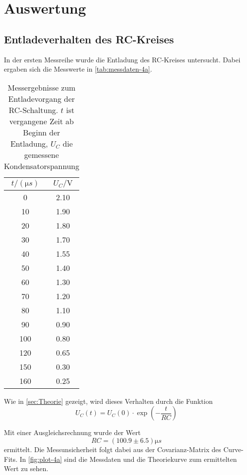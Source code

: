 \section{Auswertung}
\label{sec:Auswertung}

\subsection{Entladeverhalten des RC-Kreises}
\label{sec:4a-auswertung}

In der ersten Messreihe wurde die Entladung des RC-Kreises untersucht. Dabei ergaben sich
die Messwerte in \autoref{tab:messdaten-4a}.

\begin{table}
	\centering
	\caption{Messergebnisse zum Entladevorgang der RC-Schaltung. $t$ ist vergangene Zeit 
	ab Beginn der Entladung, $U_C$ die gemessene Kondensatorspannung}
	\label{tab:messdaten-4a}
	\begin{tabular}{c c}
		\toprule
		$t / (\si{\micro s})$ & $U_C / \si{\volt}$ \\
		\midrule
		0  	&2.10 \\
		10  	&1.90 \\
		20  	&1.80 \\
		30  	&1.70 \\
		40  	&1.55 \\
		50  	&1.40 \\
		60  	&1.30 \\
		70  	&1.20 \\
		80  	&1.10 \\
		90  	&0.90 \\
		100  	&0.80 \\
		120  	&0.65 \\
		150  	&0.30 \\
		160  	&0.25 \\
		\bottomrule
	\end{tabular}
\end{table}

Wie in \autoref{sec:Theorie} gezeigt, wird dieses Verhalten durch die Funktion
\begin{equation}
	U_C(t) = U_C(0) \cdot \exp\left(-\frac{t}{RC}\right)
\end{equation}

Mit einer Ausgleichsrechnung wurde der Wert
\begin{equation}
	RC = (100.9 \pm 6.5) \si{\micro s}
	\label{eqn:ergebnis-4a}
\end{equation}
ermittelt. Die Messunsicherheit folgt dabei aus der Covarianz-Matrix des Curve-Fits.
In \autoref{fig:plot-4a} sind die Messdaten und die Theoriekurve zum ermittelten Wert zu sehen.

